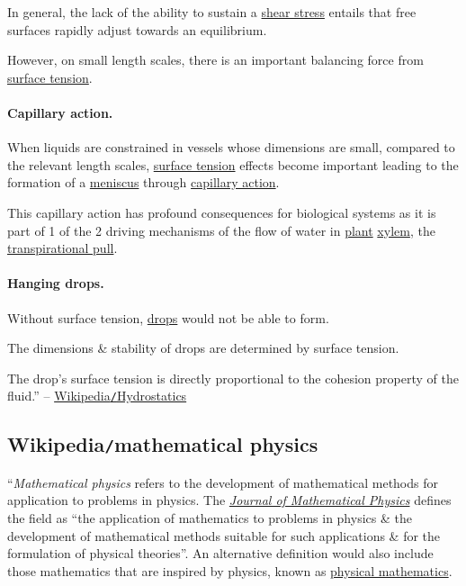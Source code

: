 \documentclass{article}
\begin{document}
In general, the lack of the ability to sustain a \href{https://en.wikipedia.org/wiki/Shear_stress}{shear stress} entails that free surfaces rapidly adjust towards an equilibrium.

However, on small length scales, there is an important balancing force from \href{https://en.wikipedia.org/wiki/Surface_tension}{surface tension}.

\paragraph{Capillary action.} When liquids are constrained in vessels whose dimensions are small, compared to the relevant length scales, \href{https://en.wikipedia.org/wiki/Surface_tension}{surface tension} effects become important leading to the formation of a \href{https://en.wikipedia.org/wiki/Meniscus_(liquid)}{meniscus} through \href{https://en.wikipedia.org/wiki/Capillary_action}{capillary action}.

This capillary action has profound consequences for biological systems as it is part of 1 of the 2 driving mechanisms of the flow of water in \href{https://en.wikipedia.org/wiki/Plant}{plant} \href{https://en.wikipedia.org/wiki/Xylem}{xylem}, the \href{https://en.wikipedia.org/wiki/Transpirational_pull}{transpirational pull}.

\paragraph{Hanging drops.} Without surface tension, \href{https://en.wikipedia.org/wiki/Drop_(liquid)}{drops} would not be able to form.

The dimensions \& stability of drops are determined by surface tension.

The drop's surface tension is directly proportional to the cohesion property of the fluid.'' -- \href{https://en.wikipedia.org/wiki/Hydrostatics}{Wikipedia{\tt/}Hydrostatics}


\subsection{Wikipedia{\tt/}mathematical physics}
``{\it Mathematical physics} refers to the development of mathematical methods for application to problems in physics. The \href{https://en.wikipedia.org/wiki/Journal_of_Mathematical_Physics}{\it Journal of Mathematical Physics} defines the field as ``the application of mathematics to problems in physics \& the development of mathematical methods suitable for such applications \& for the formulation of physical theories''. An alternative definition would also include those mathematics that are inspired by physics, known as \href{https://en.wikipedia.org/wiki/Physical_mathematics}{physical mathematics}.
\end{document}
